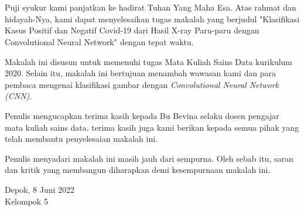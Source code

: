 \chapter*{\kataPengantar}

Puji syukur kami panjatkan ke hadirat Tuhan Yang Maha Esa. Atas rahmat dan hidayah-Nya, kami dapat menyelesaikan tugas makalah yang berjudul "Klasifikasi Kasus Positif dan Negatif Covid-19 dari Hasil X-ray Paru-paru dengan Convolutional Neural Network" dengan tepat waktu.

Makalah ini disusun untuk memenuhi tugas Mata Kuliah Sains Data kurikulum 2020. Selain itu, makalah ini bertujuan menambah wawasan kami dan para pembaca mengenai klasifikasi gambar dengan \textit{Convolutional Neural Network (CNN)}.

Penulis mengucapkan terima kasih kepada Bu Bevina selaku dosen pengajar mata kuliah sains data. terima kasih juga kami berikan kepada semua pihak yang telah membantu penyelesaian makalah ini.

Penulis menyadari makalah ini masih jauh dari sempurna. Oleh sebab itu, saran dan kritik yang membangun diharapkan demi kesempurnaan makalah ini.

\vspace*{0.1cm}
\begin{flushright}
Depok,  8 Juni 2022\\[0.1cm]
\vspace*{1cm}
Kelompok 5

\end{flushright}